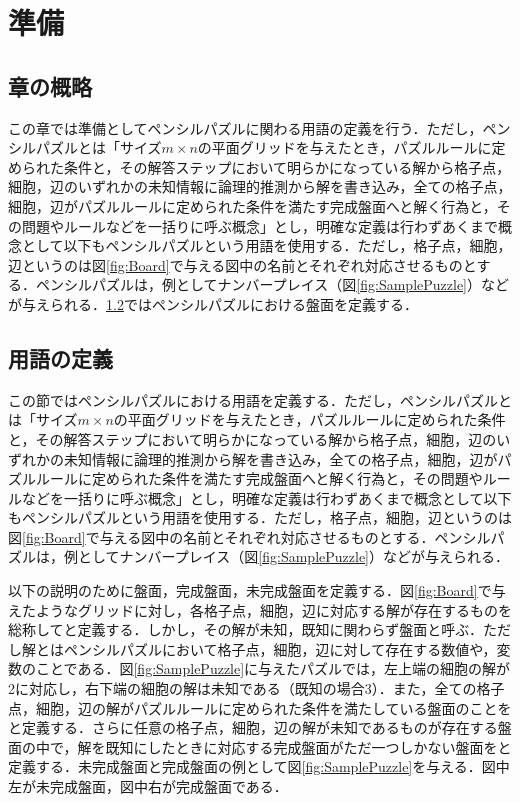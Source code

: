 \chapter{準備}\label{chapter:2}
\section{章の概略}\label{section:1}
この章では準備としてペンシルパズルに関わる用語の定義を行う．ただし，ペンシルパズルとは「サイズ$m\times n$の平面グリッドを与えたとき，パズルルールに定められた条件と，その解答ステップにおいて明らかになっている解から格子点，細胞，辺のいずれかの未知情報に論理的推測から解を書き込み，全ての格子点，細胞，辺がパズルルールに定められた条件を満たす完成盤面へと解く行為と，その問題やルールなどを一括りに呼ぶ概念」とし，明確な定義は行わずあくまで概念として以下もペンシルパズルという用語を使用する．ただし，格子点，細胞，辺というのは図\ref{fig:Board}で与える図中の名前とそれぞれ対応させるものとする．ペンシルパズルは，例としてナンバープレイス（図\ref{fig:SamplePuzzle}）などが与えられる．\ref{section:2}ではペンシルパズルにおける盤面を定義する．

\section{用語の定義}\label{section:2}
この節ではペンシルパズルにおける用語を定義する．ただし，ペンシルパズルとは「サイズ$m\times n$の平面グリッドを与えたとき，パズルルールに定められた条件と，その解答ステップにおいて明らかになっている解から格子点，細胞，辺のいずれかの未知情報に論理的推測から解を書き込み，全ての格子点，細胞，辺がパズルルールに定められた条件を満たす完成盤面へと解く行為と，その問題やルールなどを一括りに呼ぶ概念」とし，明確な定義は行わずあくまで概念として以下もペンシルパズルという用語を使用する．ただし，格子点，細胞，辺というのは図\ref{fig:Board}で与える図中の名前とそれぞれ対応させるものとする．ペンシルパズルは，例としてナンバープレイス（図\ref{fig:SamplePuzzle}）などが与えられる．

以下の説明のために盤面，完成盤面，未完成盤面を定義する．図\ref{fig:Board}で与えたようなグリッドに対し，各格子点，細胞，辺に対応する解が存在するものを総称してと定義する．しかし，その解が未知，既知に関わらず盤面と呼ぶ．ただし解とはペンシルパズルにおいて格子点，細胞，辺に対して存在する数値や，変数のことである．図\ref{fig:SamplePuzzle}に与えたパズルでは，左上端の細胞の解が2に対応し，右下端の細胞の解は未知である（既知の場合3）．また，全ての格子点，細胞，辺の解がパズルルールに定められた条件を満たしている盤面のことをと定義する．さらに任意の格子点，細胞，辺の解が未知であるものが存在する盤面の中で，解を既知にしたときに対応する完成盤面がただ一つしかない盤面をと定義する．未完成盤面と完成盤面の例として図\ref{fig:SamplePuzzle}を与える．図中左が未完成盤面，図中右が完成盤面である．


